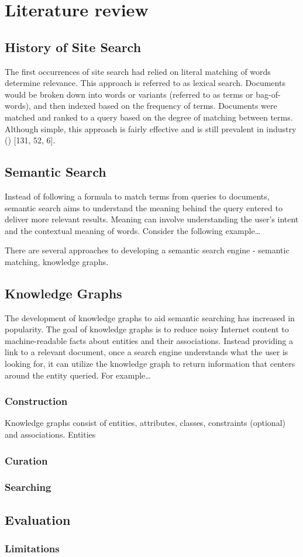 \chapter{Literature review\label{cha:litreivew}}

\section{History of Site Search}
The first occurrences of site search had relied on literal matching of words determine relevance. This approach is referred to as lexical search. Documents would be broken down into words or variants (referred to as terms or bag-of-words), and then indexed based on the frequency of terms. Documents were matched and ranked to a query based on the degree of matching between terms. Although simple, this approach is fairly effective and is still prevalent in industry (\cite{Li2013a}) [131, 52, 6].



\section{Semantic Search}
Instead of following a formula to match terms from queries to documents, semantic search aims to understand the meaning behind the query entered to deliver more relevant results. Meaning can involve understanding the user's intent and the contextual meaning of words. Consider the following example\dots

There are several approaches to developing a semantic search engine - semantic matching, knowledge graphs.

\section{Knowledge Graphs}
The development of knowledge graphs to aid semantic searching has increased in popularity. The goal of knowledge graphs is to reduce noisy Internet content to machine-readable facts about entities and their associations. Instead providing a link to a relevant document, once a search engine understands what the user is looking for, it can utilize the knowledge graph to return information that centers around the entity queried. For example\dots

\subsection{Construction}
Knowledge graphs consist of entities, attributes, classes, constraints (optional) and associations. Entities 
\subsection{Curation}
\subsection{Searching}

\section{Evaluation}
\subsection{Limitations}